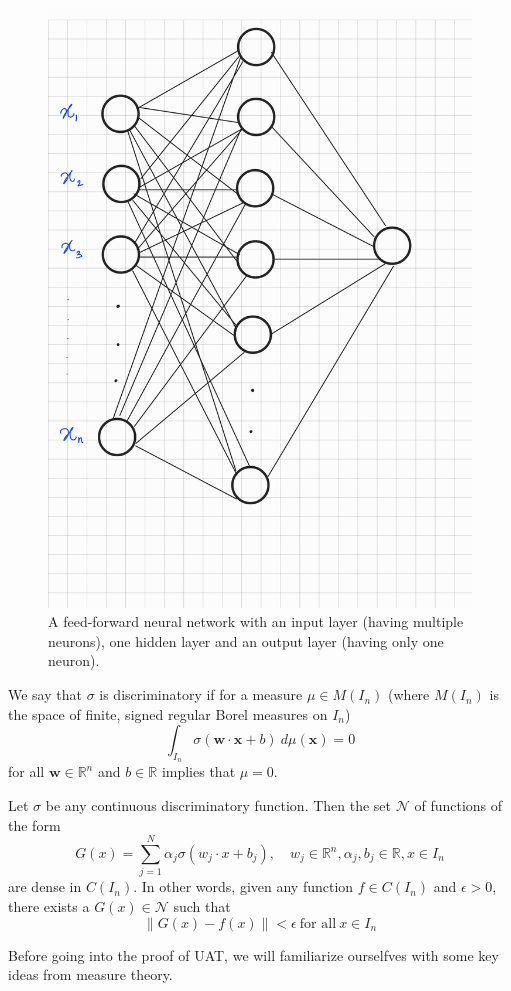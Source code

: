 \begin{figure}[htbp]
    \centering
    \includegraphics[width=.4\textwidth]{Figures/ffnn_UAT.jpg}
    \caption{A feed-forward neural network with an input layer (having multiple neurons), one hidden layer and an output layer (having only one neuron).}
    \label{fig:ffnn_UAT}
\end{figure}
\begin{definition}
    We say that $\sigma$ is discriminatory if for a measure $\mu \in M(I_n)$ (where $M(I_n)$ is the space 
of finite, signed regular Borel measures on $I_n$) 
$$\int_{I_n} \sigma (\mathbf{w}\cdot\mathbf{x} + b) \ d\mu(\mathbf{x}) = 0$$
for all $\mathbf{w} \in \mathbb{R}^n$ and $b\in \mathbb{R}$ implies that $\mu = 0$.
\end{definition}
\begin{thm}
    \label{thm:UAT}
    Let $\sigma$ be any continuous discriminatory function. Then the set $\mathcal{N}$ of functions of the form 
    $$G(x) = \sum_{j=1}^{N} \alpha_j \sigma (w_j\cdot x + b_j), \quad w_j \in \mathbb{R}^n, \alpha_j, b_j \in \mathbb{R}, x \in I_n$$
    are dense in $C(I_n)$. In other words, given any function $f \in C(I_n)$ and $\epsilon > 0$, there exists
    a $G(x) \in \mathcal{N}$ such that 
    $$\| G(x) - f(x)\| < \epsilon \ \text{for all} \ x \in I_n$$
\end{thm}
Before going into the proof of UAT, we will familiarize ourselfves with some key ideas from measure theory.
